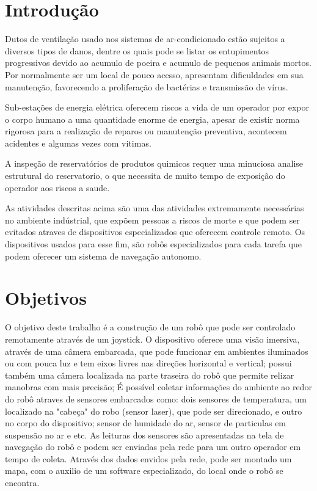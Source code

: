 \documentclass[a4paper,12pt]{article}
\begin{document}
\section{Introdução}
	Dutos de ventilação usado nos sistemas de ar-condicionado estão sujeitos a diversos tipos de danos, dentre os quais pode se listar os entupimentos progressivos devido ao acumulo de poeira e acumulo de pequenos animais mortos. Por normalmente ser um local de pouco acesso, apresentam dificuldades em sua manutenção, favorecendo a proliferação de bactérias e transmissão de vírus.\par
	Sub-estações de energia elétrica oferecem riscos a vida de um operador por expor o corpo humano a uma quantidade enorme de energia, apesar de existir norma rigorosa para a realização de reparos ou manutenção preventiva, acontecem acidentes e algumas vezes com vitimas.\par
	A inspeção de reservatórios de produtos quimicos requer uma minuciosa analise estrutural do reservatorio, o que necessita de muito tempo de exposição do operador aos riscos a saude.\par
	As atividades descritas acima são uma das atividades extremamente necessárias no ambiente indústrial, que expõem pessoas a riscos de morte e que podem ser evitados atraves de dispositivos especializados que oferecem controle remoto. Os dispositivos usados para esse fim, são robôs especializados para cada tarefa que podem oferecer um sistema de navegação autonomo.

\section{Objetivos}
	O objetivo deste trabalho é a construção de um robô que pode ser controlado remotamente através de um joystick. O dispositivo oferece uma visão imersiva, através de uma câmera embarcada, que pode funcionar em ambientes iluminados ou com pouca luz e tem eixos livres nas direções horizontal e vertical; possui também uma câmera localizada na parte traseira do robô que permite relizar manobras com mais precisão; É possível coletar informações do ambiente ao redor do robô atraves de sensores embarcados como: dois sensores de temperatura, um localizado na "cabeça" do robo (sensor laser), que pode ser direcionado, e outro no corpo do dispositivo; sensor de humidade do ar, sensor de particulas em suspensão no ar e etc. As leituras dos sensores são apresentadas na tela de navegação do robô e podem ser enviadas pela rede para um outro operador em tempo de coleta. Através dos dados envidos pela rede, pode ser montado um mapa, com o auxilio de um software especializado, do local onde o robô se encontra.
\end{document}
